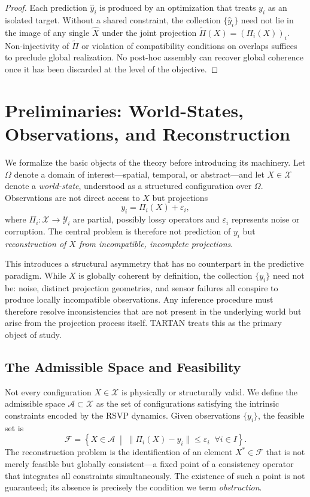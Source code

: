\documentclass[12pt, oneside]{article}
\begin{document}
\begin{proof}
Each prediction $\hat{y}_i$ is produced by an optimization that treats $y_i$ as an isolated target. Without a shared constraint, the collection $\{\hat{y}_i\}$ need not lie in the image of any single $\hat{X}$ under the joint projection $\tilde{\Pi}(X) = (\Pi_i(X))_i$. Non-injectivity of $\tilde{\Pi}$ or violation of compatibility conditions on overlaps suffices to preclude global realization. No post-hoc assembly can recover global coherence once it has been discarded at the level of the objective.
\end{proof}

\section{Preliminaries: World-States, Observations, and Reconstruction}

We formalize the basic objects of the theory before introducing its machinery. Let $\Omega$ denote a domain of interest---spatial, temporal, or abstract---and let $X \in \mathcal{X}$ denote a \emph{world-state}, understood as a structured configuration over $\Omega$. Observations are not direct access to $X$ but projections
\[
y_i = \Pi_i(X) + \varepsilon_i,
\]
where $\Pi_i : \mathcal{X} \to \mathcal{Y}_i$ are partial, possibly lossy operators and $\varepsilon_i$ represents noise or corruption. The central problem is therefore not prediction of $y_i$ but \emph{reconstruction of $X$ from incompatible, incomplete projections}.

This introduces a structural asymmetry that has no counterpart in the predictive paradigm. While $X$ is globally coherent by definition, the collection $\{y_i\}$ need not be: noise, distinct projection geometries, and sensor failures all conspire to produce locally incompatible observations. Any inference procedure must therefore resolve inconsistencies that are not present in the underlying world but arise from the projection process itself. TARTAN treats this as the primary object of study.

\subsection{The Admissible Space and Feasibility}

Not every configuration $X \in \mathcal{X}$ is physically or structurally valid. We define the admissible space $\mathcal{A} \subset \mathcal{X}$ as the set of configurations satisfying the intrinsic constraints encoded by the RSVP dynamics. Given observations $\{y_i\}$, the feasible set is
\[
\mathcal{F} = \left\{ X \in \mathcal{A} \;\middle|\; \|\Pi_i(X) - y_i\| \leq \varepsilon_i \;\; \forall i \in I \right\}.
\]
The reconstruction problem is the identification of an element $X^\ast \in \mathcal{F}$ that is not merely feasible but globally consistent---a fixed point of a consistency operator that integrates all constraints simultaneously. The existence of such a point is not guaranteed; its absence is precisely the condition we term \emph{obstruction}.
\end{document}
